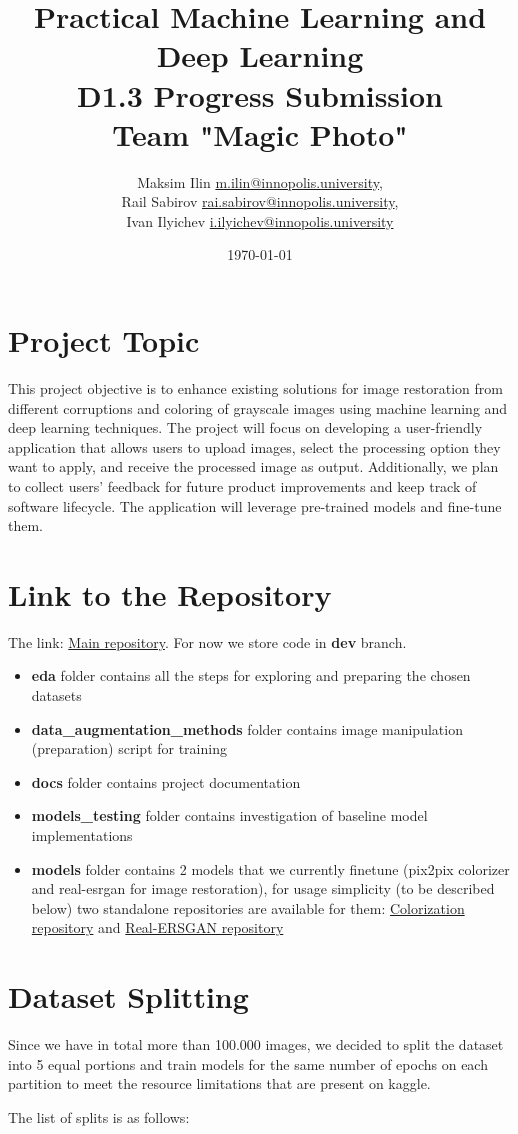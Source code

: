 \documentclass{article}
\title{Practical Machine Learning and Deep Learning\\D1.3 Progress Submission\\
Team "Magic Photo"}
\author{Maksim Ilin \href{mailto:m.ilin@innopolis.university}{m.ilin@innopolis.university},\\ Rail Sabirov \href{mailto:rai.sabirov@innopolis.university}{rai.sabirov@innopolis.university},\\ Ivan Ilyichev \href{mailto:i.ilyichev@innopolis.university}{i.ilyichev@innopolis.university}}
\date{\today}
\begin{document}
\maketitle

\section{Project Topic}
\par This project objective is to enhance existing solutions for image restoration from different corruptions and coloring of grayscale images using machine learning and deep learning techniques. The project will focus on developing a user-friendly application that allows users to upload images, select the processing option they want to apply, and receive the processed image as output. Additionally, we plan to collect users' feedback for future product improvements and keep track of software lifecycle. The application will leverage pre-trained models and fine-tune them. 

\section{Link to the Repository}
\par The link: \href{https://github.com/ivaniinno/Image-Restoration-and-Coloring/tree/dev}{Main repository}. For now we store code in \textbf{dev} branch.
\begin{itemize}
    \item \textbf{eda} folder contains all the steps for exploring and preparing the chosen datasets
    \item \textbf{data\_augmentation\_methods} folder contains image manipulation (preparation) script for training
    \item \textbf{docs} folder contains project documentation
    \item \textbf{models\_testing} folder contains investigation of baseline model implementations
    \item \textbf{models} folder contains 2 models that we currently finetune (pix2pix colorizer and real-esrgan for image restoration), for usage simplicity (to be described below) two standalone repositories are available for them: \href{https://github.com/RailSAB/coloringModel}{Colorization repository} and \href{https://github.com/RailSAB/real-esrganmodel}{Real-ERSGAN repository}
\end{itemize} 

\section{Dataset Splitting}
\par Since we have in total more than 100.000 images, we decided to split the dataset into 5 equal portions and train models for the same number of epochs on each partition to meet the resource limitations that are present on kaggle.
\par The list of splits is as follows:
\end{document}
